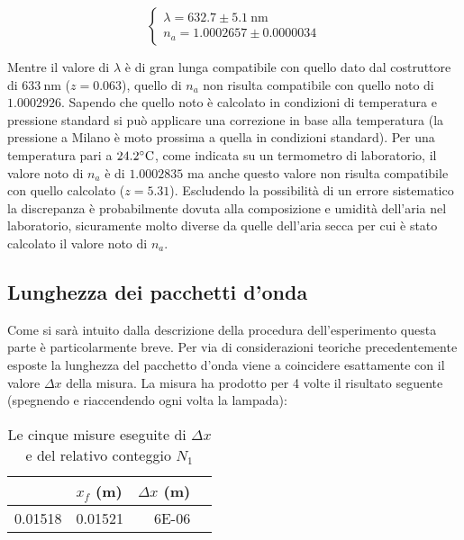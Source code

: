\documentclass[a4paper,11pt]{article}
\begin{document}
	\begin{equation}
		\begin{cases}
			\lambda = 632.7 \pm 5.1 \ \text{nm} \\ n_a = \num{1.0002657} \pm \num{0.0000034}
		\end{cases}
	\end{equation}

	Mentre il valore di $\lambda$ è di gran lunga compatibile con quello dato dal costruttore di $633 \ \text{nm}$ ($z = 0.063$), quello di $n _a$ non risulta compatibile con quello noto di $1.0002926$.
	Sapendo che quello noto è calcolato in condizioni di temperatura e pressione standard si può applicare una correzione in base alla temperatura (la pressione a Milano è moto prossima a quella in condizioni standard).
	Per una temperatura pari a $24.2 \celsius$, come indicata su un termometro di laboratorio, il valore noto di $n _a$ è di $1.0002835$ ma anche questo valore non risulta compatibile con quello calcolato ($z = 5.31$).
	Escludendo la possibilità di un errore sistematico la discrepanza è probabilmente dovuta alla composizione e umidità dell'aria nel laboratorio, sicuramente molto diverse da quelle dell'aria secca per cui è stato calcolato il valore noto di $n _a$.
	
	\subsection{Lunghezza dei pacchetti d'onda}
	Come si sarà intuito dalla descrizione della procedura dell'esperimento questa parte è particolarmente breve. Per via di considerazioni teoriche precedentemente esposte la lunghezza del pacchetto d'onda viene a coincidere esattamente con il valore $\Delta x$ della misura. La misura ha prodotto per 4 volte il risultato seguente (spegnendo e riaccendendo ogni volta la lampada):
	
	\begin{table}[htbp]
  \centering
  \caption{Le cinque misure eseguite di $\Delta x$ e del relativo conteggio $N _1$}
    \begin{tabular}{rrrr}
    \bottomrule
    \rowcolor[rgb]{ .267,  .447,  .769} \multicolumn{1}{l}{\textcolor[rgb]{ 1,  1,  1}{\textbf{$x _i$ (m)}}} & \multicolumn{1}{l}{\textcolor[rgb]{ 1,  1,  1}{\textbf{$x _f$ (m)}}} & \multicolumn{1}{l}{\textcolor[rgb]{ 1,  1,  1}{\textbf{$\Delta x$ (m)}}} \\
    \toprule
    0.01518 & 0.01521 & 6E-06 \\
    \end{tabular}%
\end{table}%
\end{document}
